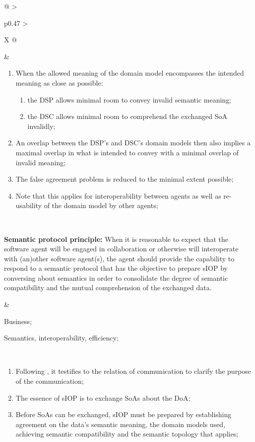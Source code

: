 \begin{xltabular}[l]{\linewidth}{@{} >{\small\raggedright\arraybackslash}p{0.47\linewidth} >{\small\raggedright\arraybackslash}X @{}}
&
\begin{enumerate}[left=10pt, nosep]
  \item When the allowed meaning of the domain model encompasses the intended meaning as close as possible:
  \begin{enumerate}
    \item the DSP allows minimal room to convey invalid semantic meaning;
    \item the DSC allows minimal room to comprehend the exchanged SoA invalidly;
  \end{enumerate}
  \item An overlap between the DSP's and DSC's domain models then also implies a maximal overlap in what is intended to convey with a minimal overlap of invalid meaning; 
  \item The false agreement problem is reduced to the minimal extent possible;
  \item Note that this applies for interoperability between agents as well as re-usability of the domain model by other agents;
\end{enumerate} \\
%
%
%
\begin{mmdp}\label{dp:spp}{\bfseries Semantic protocol principle:}
\quad When it is reasonable to expect that the software agent will be engaged in collaboration or otherwise will interoperate with (an)other software agent(s), the agent should provide the capability to respond to a semantic protocol that has the objective to prepare sIOP by conversing about semantics in order to consolidate the degree of semantic compatibility and the mutual comprehension of the exchanged data.
\end{mmdp}
&
\begin{description}[labelwidth=3.7cm,leftmargin=3.7cm+1ex,nosep,topsep=2ex,labelsep=1ex,font=\bfseries]
  \item[Type of information:] Business;
  \item[Quality attributes:] Semantics, interoperability, efficiency;
\end{description} \\
\begin{enumerate}[left=6pt, nosep]
  \item Following \cite{Grice:1991BT}, it testifies to the relation of communication to clarify the purpose of the communication;
  \item The essence of sIOP is to exchange SoAs about the DoA;
  \item Before SoAs can be exchanged, sIOP must be prepared by establishing agreement on the data's semantic meaning, the domain models used, achieving semantic compatibility and the semantic topology that applies;

\end{enumerate}
\end{xltabular}

